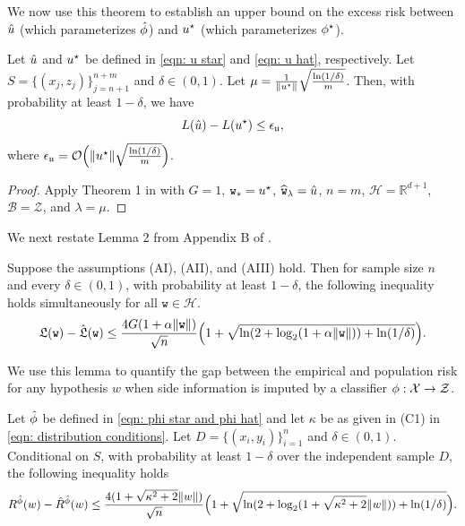 We now use this theorem to establish an upper bound on the excess risk between $\hat{u}$ (which parameterizes $\hat{\phi}$) and $u^\star$ (which parameterizes $\phi^\star$).

\begin{lem}\label{lem: learning theory on X,Z}
    Let $\hat{u}$ and $u^\star$ be defined in \eqref{eqn: u star} and \eqref{eqn: u hat}, respectively. Let $S = \{(x_j, z_j)\}_{j=n+1}^{n+m}$ and $\delta \in (0,1)$. Let $\mu = \frac{1}{\|u^\star\|}\sqrt{\frac{\ln(1/\delta)}{m}}$. Then, with probability at least $1-\delta$, we have
    \begin{equation}\label{eqn: rhs eps}
        L(\hat{u}) - L(u^\star) \leq \epsilon_{\mathfrak{u}}, 
    \end{equation}
    where $\epsilon_{\mathfrak{u}} = \mathcal{O}\Big(\|u^\star\|\sqrt{\frac{\ln(1/\delta)}{m}}\Big)$.
\end{lem}

\begin{proof}
Apply Theorem 1 in \cite{della2021regularized} with $G = 1$, $\mathtt{w}_* = u^\star$, $\widehat{\mathtt{w}}_\lambda = \hat{u}$, $n = m$, $\mathcal{H} = \mathbb{R}^{d+1}$, $\mathcal{B} = \mathcal{Z}$, and $\lambda = \mu$.
\end{proof}

We next restate Lemma 2 from Appendix B of \cite{della2021regularized}.
\begin{lem} Suppose the assumptions (AI), (AII), and (AIII) hold. Then for sample size $n$ and every $\delta \in (0,1)$, with probability at least $1-\delta$, the following inequality holds simultaneously for all $\mathtt{w}\in\mathcal H$.
\begin{equation*}
    \mathfrak{L}(\mathtt{w}) - \hat{\mathfrak{L}}(\mathtt{w}) \leq  \frac{4G(1+\alpha\|\mathtt{w}\|)}{\sqrt{n}}\Big(1 + \sqrt{\ln(2+\log_2(1+\alpha\|\mathtt{w}\|)) + \ln(1/\delta)}\Big).
\end{equation*}
\end{lem}

We use this lemma to quantify the gap between the empirical and population risk for any hypothesis $w$ when side information is imputed by a classifier $\phi : \mathcal{X} \to \mathcal{Z}$.

\begin{lem}\label{lem: empirical and population risk gap}
    Let $\hat{\phi}$ be defined in \eqref{eqn: phi star and phi hat} and let $\kappa$ be as given in (C1) in \eqref{eqn: distribution conditions}. Let $D= \{(x_i, y_i)\}_{i=1}^n$ and $\delta \in (0,1)$. Conditional on $S$, with probability at least $1-\delta$ over the independent sample $D$, the following inequality holds
    \begin{equation*}
    \begin{aligned}
        R^{\hat{\phi}}(w) - \hat{R}^{\hat{\phi}}(w) \leq
        \frac{4(1+\sqrt{\kappa^2+2}\|w\|)}{\sqrt{n}}\Big(1+\sqrt{\ln(2+\log_2(1+\sqrt{\kappa^2+2}\|w\|)) +
        \ln(1/\delta)}\Big).
    \end{aligned}
    \end{equation*}
\end{lem}

